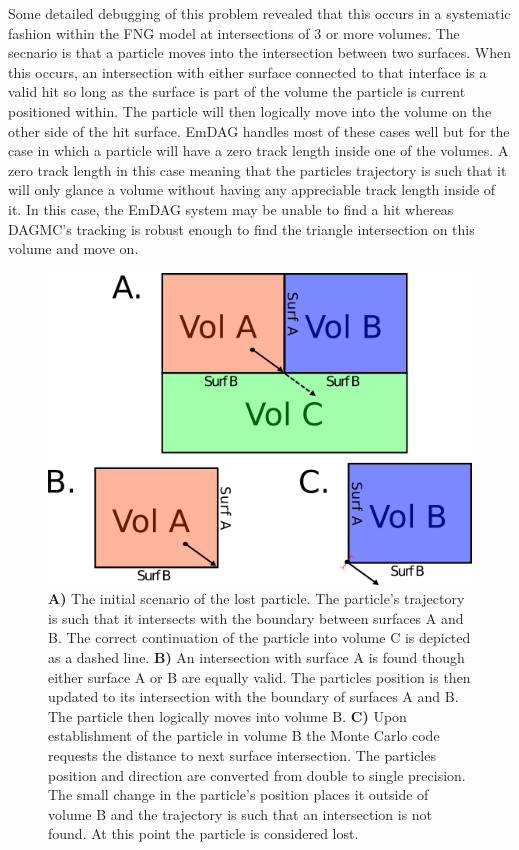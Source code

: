 \documentclass[12pt, a4paper]{article}
\begin{document}
Some detailed debugging of this problem revealed that this occurs in a systematic fashion within the FNG model at intersections of 3 or more volumes. The secnario is that a particle moves into the intersection between two surfaces. When this occurs, an intersection with either surface connected to that interface is a valid hit so long as the surface is part of the volume the particle is current positioned within. The particle will then logically move into the volume on the other side of the hit surface. EmDAG handles most of these cases well but for the case in which a particle will have a zero track length inside one of the volumes. A zero track length in this case meaning that the particles trajectory is such that it will only glance a volume without having any appreciable track length inside of it. In this case, the EmDAG system may be unable to find a hit whereas DAGMC's tracking is robust enough to find the triangle intersection on this volume and move on.

\begin{figure}[h!]
  \begin{centering}
    \includegraphics[scale=0.7]{emdag_lost.png}
    \caption{\textbf{A)} The initial scenario of the lost particle. The particle's trajectory is such that it intersects with the boundary between surfaces A and B. The correct continuation of the particle into volume C is depicted as a dashed line. \textbf{B)} An intersection with surface A is found though either surface A or B are equally valid. The particles position is then updated to its intersection with the boundary of surfaces A and B. The particle then logically moves into volume B. \textbf{C)} Upon establishment of the particle in volume B the Monte Carlo code requests the distance to next surface intersection. The particles position and direction are converted from double to single precision. The small change in the particle's position places it outside of volume B and the trajectory is such that an intersection is not found. At this point the particle is considered lost.}
    \label{emdag-lost-particles}
  \end{centering}
  \end{figure}
\end{document}
